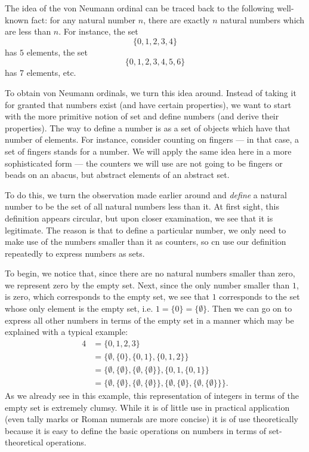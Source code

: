 \documentclass[12pt]{article}
\begin{document}
The idea of the von Neumann ordinal can be traced back to the following
well-known fact: for any natural number $n$, there are exactly $n$ 
natural numbers which are less than $n$.  For instance, the set
\[
\{ 0, 1, 2, 3, 4 \}
\]
has $5$ elements, the set
\[
\{0, 1, 2, 3, 4, 5, 6 \}
\]
has $7$ elements, etc.

To obtain von Neumann ordinals, we turn this idea around.  Instead of
taking it for granted that numbers exist (and have certain properties),
we want to start with the more primitive notion of set and define
numbers (and derive their properties).  The way to define a number is
as a set of objects which have that number of elements.  For instance,
consider counting on fingers --- in that case, a set of fingers stands
for a number.  We will apply the same idea here in a more sophisticated
form --- the counters we will use are not going to be fingers or beads 
on an abacus, but abstract elements of an abstract set.

To do this, we turn the observation made earlier around and
\emph{define} a natural number to be the set of all natural numbers
less than it.  At first sight, this definition appears circular, but
upon closer examination, we see that it is legitimate.  The reason
is that to define a particular number, we only need to make use
of the numbers smaller than it as counters, so cn use our definition
repeatedly to express numbers as sets.

To begin, we notice that, since there are no natural numbers smaller
than zero, we represent zero by the empty set.  Next, since the only
number smaller than $1$, is zero, which corresponds to the empty set,
we see that $1$ corresponds to the set whose only element is the
empty set, i.e. $1 = \{ 0 \} = \{ \emptyset \}$.  Then we can go on to
express all other numbers in terms of the empty set in a manner which
may be explained with a typical example:
\begin{align*}
4 &= \{ 0, 1, 2, 3 \} \\
&= \{ \emptyset, \{ 0 \}, \{ 0, 1 \}, \{ 0, 1, 2 \} \} \\
& = \{ \emptyset,
    \{ \emptyset \},
    \{ \emptyset, \{ \emptyset \} \},
    \{ 0, 1, \{ 0, 1 \} \} \\
&= \{ \emptyset, 
   \{ \emptyset \},
   \{ \emptyset, \{ \emptyset \} \},
   \{ \emptyset, \{ \emptyset \} , \{ \emptyset, \{ \emptyset \} \} \}.
\end{align*}
As we already see in this example, this representation of integers 
in terms of the empty set is extremely clumsy.  While it is of little
use in practical application (even tally marks or Roman numerals are
more concise) it is of use theoretically because it is easy to 
define the basic operations on numbers in terms of set-theoretical
operations.
\end{document}
